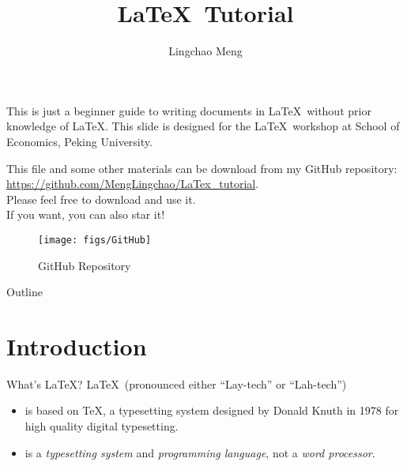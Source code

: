 \documentclass[11pt]{beamer}
\begin{document}
	
	\begin{CJK*}{UTF8}{gkai}
		
	\author[LC Meng]{Lingchao Meng}
	\title[LaTeX Tutorial]{\LaTeX\ Tutorial}

\begin{frame}
    \maketitle
\end{frame}

\begin{frame}
	This is  just a beginner guide to writing documents in \LaTeX\ without prior knowledge of \LaTeX. This slide is designed for the \LaTeX\ workshop at School of Economics, Peking University.
\end{frame}

\begin{frame}
	This file and some other materials can be download from my GitHub repository: \underline{https://github.com/MengLingchao/LaTex\_tutorial}. \\Please feel free to download and use it.\\
	If you want, you can also star it!
	\begin{figure}
		\centering
		\texttt{[image: figs/GitHub]}
		\caption{GitHub Repository}
		\label{fig:github}
	\end{figure}
	
\end{frame}

\begin{frame}{Outline}
	\tableofcontents
\end{frame}

\section{Introduction}
\begin{frame}
	\sectionpage
\end{frame}

\begin{frame}[fragile]{What's \LaTeX?}
\LaTeX\ (pronounced either “Lay-tech” or “Lah-tech”) 
	\begin{itemize}
		\item is based on \TeX, a typesetting system designed by Donald Knuth in 1978 for high quality digital typesetting.
		\item is a \textit{typesetting system} and \textit{programming language}, not a \textit{word processor}.
	\end{itemize}


\end{frame}
\end{CJK*}
\end{document}
